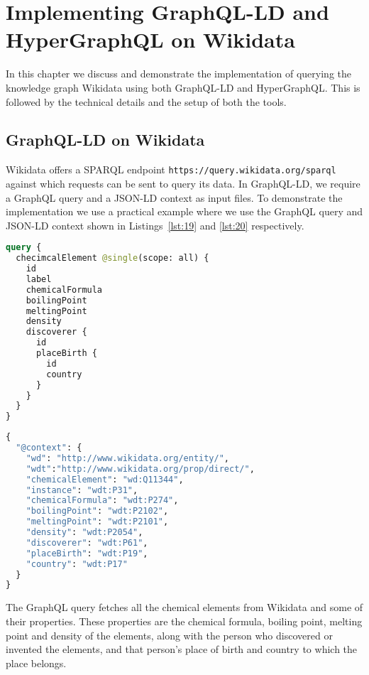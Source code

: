 \chapter{Implementing GraphQL-LD and HyperGraphQL on Wikidata}
\label{ch:4}
In this chapter we discuss and demonstrate the implementation of querying the knowledge graph Wikidata using both GraphQL-LD and HyperGraphQL. This is followed by the technical details and the setup of both the tools.

\section{GraphQL-LD on Wikidata}

Wikidata offers a SPARQL endpoint \texttt{https://query.wikidata.org/sparql} against which requests can be sent to query its data. In GraphQL-LD, we require a GraphQL query and a JSON-LD context as input files. To demonstrate the implementation we use a practical example where we use the GraphQL query and JSON-LD context shown in Listings~\ref{lst:19} and \ref{lst:20} respectively. 

\begin{minipage}{\linewidth}
\begin{lstlisting}[label=lst:19, caption={A GraphQL Query in GraphQL-LD}, language=GrapHQL]
query {
  checimcalElement @single(scope: all) {
    id
    label
    chemicalFormula
    boilingPoint
    meltingPoint
    density
    discoverer {
      id
      placeBirth {
        id
        country
      }
    }
  }
}
\end{lstlisting}
\end{minipage}

\begin{minipage}{\linewidth}
\begin{lstlisting}[label=lst:20, caption={JSON-LD Context}, language=GraphQL]
{
  "@context": {
    "wd": "http://www.wikidata.org/entity/",
    "wdt":"http://www.wikidata.org/prop/direct/",
    "chemicalElement": "wd:Q11344",
    "instance": "wdt:P31",
    "chemicalFormula": "wdt:P274",
    "boilingPoint": "wdt:P2102",
    "meltingPoint": "wdt:P2101",
    "density": "wdt:P2054",
    "discoverer": "wdt:P61",
    "placeBirth": "wdt:P19",
    "country": "wdt:P17"
  }
}
\end{lstlisting}
\end{minipage}

The GraphQL query fetches all the chemical elements from Wikidata and some of their properties. These properties are the chemical formula, boiling point, melting point and density of the elements, along with the person who discovered or invented the elements, and that person’s place of birth and country to which the place belongs.

